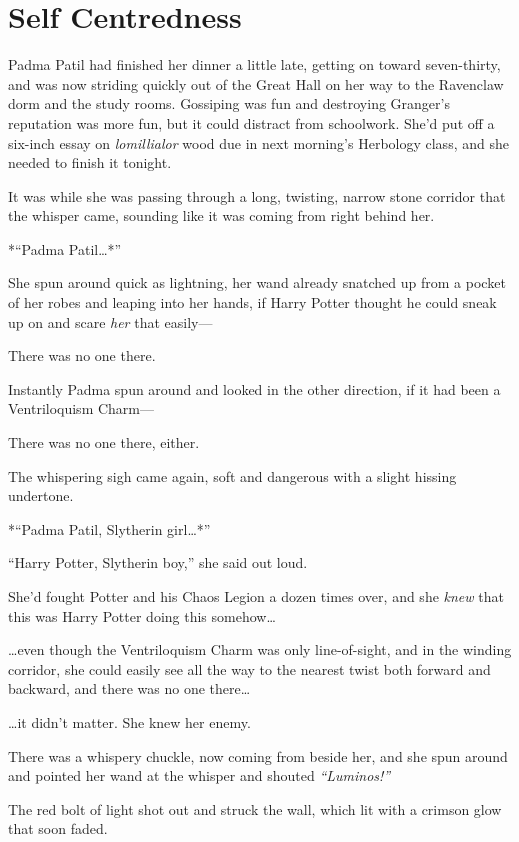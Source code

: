 \chapter{Self Centredness}

Padma Patil had finished her dinner a little late, getting on toward
seven-thirty, and was now striding quickly out of the Great Hall on her
way to the Ravenclaw dorm and the study rooms. Gossiping was fun and
destroying Granger's reputation was more fun, but it could distract from
schoolwork. She'd put off a six-inch essay on \emph{lomillialor} wood
due in next morning's Herbology class, and she needed to finish it
tonight.

It was while she was passing through a long, twisting, narrow stone
corridor that the whisper came, sounding like it was coming from right
behind her.

*``Padma Patil\ldots{}*''

She spun around quick as lightning, her wand already snatched up from a
pocket of her robes and leaping into her hands, if Harry Potter thought
he could sneak up on and scare \emph{her} that easily---

There was no one there.

Instantly Padma spun around and looked in the other direction, if it had
been a Ventriloquism Charm---

There was no one there, either.

The whispering sigh came again, soft and dangerous with a slight hissing
undertone.

*``Padma Patil, Slytherin girl\ldots{}*''

``Harry Potter, Slytherin boy,'' she said out loud.

She'd fought Potter and his Chaos Legion a dozen times over, and she
\emph{knew} that this was Harry Potter doing this somehow\ldots{}

\ldots{}even though the Ventriloquism Charm was only line-of-sight, and
in the winding corridor, she could easily see all the way to the nearest
twist both forward and backward, and there was no one there\ldots{}

\ldots{}it didn't matter. She knew her enemy.

There was a whispery chuckle, now coming from beside her, and she spun
around and pointed her wand at the whisper and shouted
\emph{``Luminos!''}

The red bolt of light shot out and struck the wall, which lit with a
crimson glow that soon faded.

